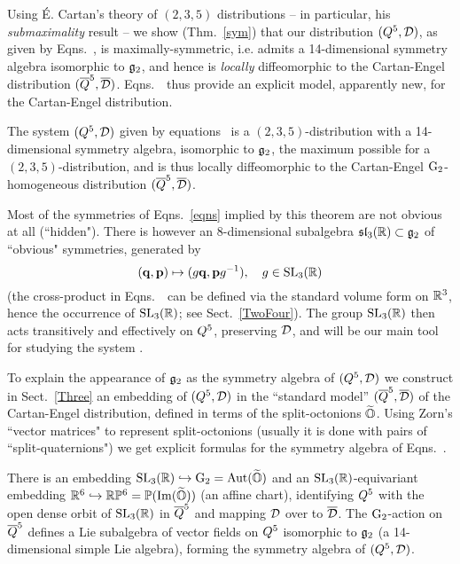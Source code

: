 Using \'E. Cartan's theory of $(2,3,5)$ distributions -- in particular, his {\em submaximality} result  -- we show (Thm.~\ref{sym}) that our distribution $(Q^5,{\mathcal D})$, as given by Eqns.~\eqnsss, is maximally-symmetric, i.e. admits a 14-dimensional symmetry algebra isomorphic to ${\mathfrak{g}}_2$, and hence is {\em locally} diffeomorphic to the  Cartan-Engel distribution $(\overline{Q}^5, \overline{\mathcal D})$. Eqns.~\eqnsss\ thus provide an explicit model, apparently new,  for the Cartan-Engel distribution.

\begin{theorem} The system $(Q^5,{\mathcal D})$ given by  equations \eqnsss\ is  a $(2,3,5)$-distribution  with a 14-dimensional symmetry algebra, isomorphic to ${\mathfrak{g}}_2$, the maximum possible for a $(2,3,5)$-distribution,  and is thus locally diffeomorphic to the Cartan-Engel ${\rm G}_2$-homogeneous distribution $(\overline{Q}^5, \overline{\mathcal D})$.
\end{theorem}

 Most of the symmetries of Eqns.~\eqref{eqns} implied by  this theorem are not obvious at all (``hidden"). There is however an 8-dimensional subalgebra  $\mathfrak{sl}_3(\mathbb{R})\subset {\mathfrak{g}}_2$  of  ``obvious" symmetries, generated by 
$$(\mathbf q,{\mathbf p})\mapsto (g\mathbf q, {\mathbf p} g^{-1}), \quad g \in {\mathrm{SL}_3(\mathbb{R})}$$
 (the cross-product  in  Eqns.~\eqnsss\ can be defined via  the standard volume form on $\mathbb{R}^3$,
hence the occurrence of ${\mathrm{SL}_3(\mathbb{R})}$; see Sect.~\ref{TwoFour}). The group ${\mathrm{SL}_3(\mathbb{R})}$ then acts transitively and effectively on $Q^5$, preserving ${\mathcal D}$, and will be our main tool for studying the system \eqns. 

To explain the  appearance of  ${\mathfrak{g}}_2$ as the symmetry algebra of $(Q^5,{\mathcal D})$ 
we construct in Sect.~\ref{Three} an embedding of $(Q^5,{\mathcal D})$  in the  ``standard model'' $(\overline{Q}^5, \overline{\mathcal D})$ of  the Cartan-Engel distribution, defined in terms of the split-octonions $\widetilde{\mathbb O}$. Using Zorn's ``vector matrices" to represent split-octonions (usually it is done with pairs of ``split-quaternions") we get explicit formulas for the symmetry algebra of Eqns.~\eqns.    

\begin{theorem} There is an embedding ${\mathrm{SL}_3(\mathbb{R})}\hookrightarrow {\rm G}_2={\rm Aut}(\widetilde{\mathbb O})$ and an ${\mathrm{SL}_3(\mathbb{R})}$-equivariant 
   embedding  $\mathbb{R}^6\hookrightarrow \mathbb{R}\mathbb{P}^6=\mathbb{P}({\rm Im}(\widetilde{\mathbb O}))$ (an affine chart), identifying  $Q^5$  with  
   the open dense orbit  of ${\mathrm{SL}_3(\mathbb{R})}$ in $\overline{Q}^5$ and mapping ${\mathcal D}$ over to $\overline{\mathcal D}$. 
   The ${\rm G}_2$-action on $\overline{Q}^5$ defines a Lie subalgebra of vector fields on $Q^5$ isomorphic to ${\mathfrak{g}}_2$ (a 14-dimensional simple Lie algebra), forming the symmetry algebra of $(Q^5, {\mathcal D})$. 
\end{theorem}

